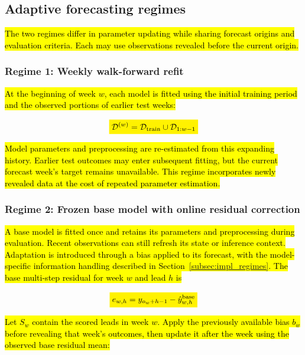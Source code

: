 \documentclass[pdflatex,sn-basic,Numbered]{sn-jnl}
\newcommand{\rev}[1]{\hl{#1}}
\newcommand{\revmath}[1]{\colorbox{yellow}{$\displaystyle #1$}}
\begin{document}
\subsection{Adaptive forecasting regimes}\label{subsec:regimes}

\rev{The two regimes differ in parameter updating while sharing forecast origins and evaluation criteria. Each may use observations revealed before the current origin.}

\subsubsection{Regime 1: Weekly walk-forward refit}

\rev{At the beginning of week $w$, each model is fitted using the initial training period and the observed portions of earlier test weeks:}

\begin{equation}
\revmath{\mathcal D^{(w)}=\mathcal D_{\mathrm{train}}\cup\mathcal D_{1:w-1}}
\label{eq:expanding}
\end{equation}

\rev{Model parameters and preprocessing are re-estimated from this expanding history. Earlier test outcomes may enter subsequent fitting, but the current forecast week's target remains unavailable. This regime incorporates newly revealed data at the cost of repeated parameter estimation.}

\subsubsection{Regime 2: Frozen base model with online residual correction}

\rev{A base model is fitted once and retains its parameters and preprocessing during evaluation. Recent observations can still refresh its state or inference context. Adaptation is introduced through a bias applied to its forecast, with the model-specific information handling described in Section~\ref{subsec:impl_regimes}. The base multi-step residual for week $w$ and lead $h$ is}

\begin{equation}
\revmath{e_{w,h}=y_{o_w+h-1}-\hat y^{\mathrm{base}}_{w,h}}
\label{eq:residual}
\end{equation}

\rev{Let $S_w$ contain the scored leads in week $w$. Apply the previously available bias $b_w$ before revealing that week's outcomes, then update it after the week using the observed base residual mean:}
\end{document}
